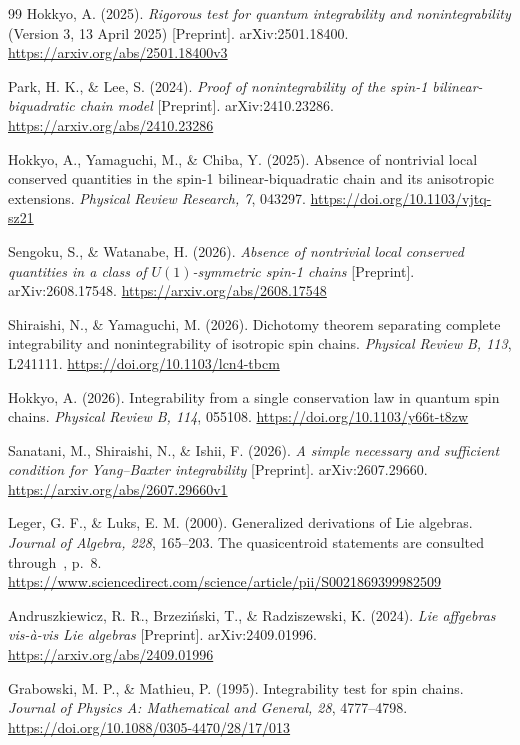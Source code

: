 \documentclass[11pt,a4paper]{article}
\numberwithin{equation}{section}
\theoremstyle{definition}\newtheorem{definition}[theorem]{Definition}
\theoremstyle{remark}\newtheorem{remark}[theorem]{Remark}
\begin{document}
\begin{thebibliography}{99}
Hokkyo, A. (2025). \emph{Rigorous test for quantum integrability and nonintegrability} (Version 3, 13 April 2025) [Preprint]. arXiv:2501.18400.\newline
\url{https://arxiv.org/abs/2501.18400v3}

Park, H. K., \& Lee, S. (2024). \emph{Proof of nonintegrability of the spin-1 bilinear-biquadratic chain model} [Preprint]. arXiv:2410.23286.\newline
\url{https://arxiv.org/abs/2410.23286}

Hokkyo, A., Yamaguchi, M., \& Chiba, Y. (2025). Absence of nontrivial local conserved quantities in the spin-1 bilinear-biquadratic chain and its anisotropic extensions. \emph{Physical Review Research, 7}, 043297.\newline
\url{https://doi.org/10.1103/vjtq-sz21}

Sengoku, S., \& Watanabe, H. (2026). \emph{Absence of nontrivial local conserved quantities in a class of $U(1)$-symmetric spin-1 chains} [Preprint]. arXiv:2608.17548.\newline
\url{https://arxiv.org/abs/2608.17548}

Shiraishi, N., \& Yamaguchi, M. (2026). Dichotomy theorem separating complete integrability and nonintegrability of isotropic spin chains. \emph{Physical Review B, 113}, L241111.\newline
\url{https://doi.org/10.1103/lcn4-tbcm}

Hokkyo, A. (2026). Integrability from a single conservation law in quantum spin chains. \emph{Physical Review B, 114}, 055108.\newline
\url{https://doi.org/10.1103/y66t-t8zw}

Sanatani, M., Shiraishi, N., \& Ishii, F. (2026). \emph{A simple necessary and sufficient condition for Yang--Baxter integrability} [Preprint]. arXiv:2607.29660.\newline
\url{https://arxiv.org/abs/2607.29660v1}

Leger, G. F., \& Luks, E. M. (2000). Generalized derivations of Lie algebras. \emph{Journal of Algebra, 228}, 165--203. The quasicentroid statements are consulted through~\cite{ABR}, p.~8.\newline
\url{https://www.sciencedirect.com/science/article/pii/S0021869399982509}

Andruszkiewicz, R. R., Brzezi\'nski, T., \& Radziszewski, K. (2024). \emph{Lie affgebras vis-\`a-vis Lie algebras} [Preprint]. arXiv:2409.01996.\newline
\url{https://arxiv.org/abs/2409.01996}

Grabowski, M. P., \& Mathieu, P. (1995). Integrability test for spin chains. \emph{Journal of Physics A: Mathematical and General, 28}, 4777--4798.\newline
\url{https://doi.org/10.1088/0305-4470/28/17/013}
\end{thebibliography}
\end{document}
